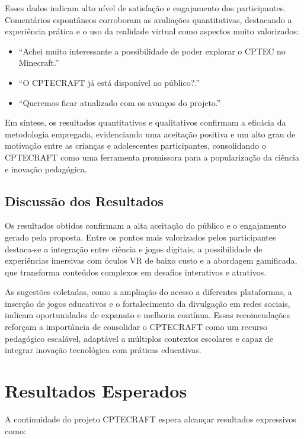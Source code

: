 Esses dados indicam alto nível de satisfação e engajamento dos participantes. Comentários espontâneos corroboram as avaliações quantitativas, destacando a experiência prática e o uso da realidade virtual como aspectos muito valorizados:

\begin{itemize}
    \item “Achei muito interessante a possibilidade de poder explorar o CPTEC no Minecraft.”  
    \item “O CPTECRAFT já está disponível ao público?.”  
    \item “Queremos ficar atualizado com os avanços do projeto.”  
\end{itemize}

Em síntese, os resultados quantitativos e qualitativos confirmam a eficácia da metodologia empregada, evidenciando uma aceitação positiva e um alto grau de motivação entre as crianças e adolescentes participantes, consolidando o CPTECRAFT como uma ferramenta promissora para a popularização da ciência e inovação pedagógica.


\section{Discussão dos Resultados}

Os resultados obtidos confirmam a alta aceitação do público e o engajamento gerado pela proposta. Entre os pontos mais valorizados pelos participantes destaca-se a integração entre ciência e jogos digitais, a possibilidade de experiências imersivas com óculos VR de baixo custo e a abordagem gamificada, que transforma conteúdos complexos em desafios interativos e atrativos.

As sugestões coletadas, como a ampliação do acesso a diferentes plataformas, a inserção de jogos educativos e o fortalecimento da divulgação em redes sociais, indicam oportunidades de expansão e melhoria contínua. Essas recomendações reforçam a importância de consolidar o CPTECRAFT como um recurso pedagógico escalável, adaptável a múltiplos contextos escolares e capaz de integrar inovação tecnológica com práticas educativas.

\chapter{Resultados Esperados}

A continuidade do projeto CPTECRAFT espera alcançar resultados expressivos como:  

